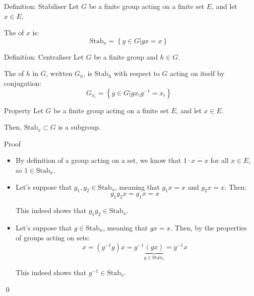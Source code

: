 \documentclass[a4paper]{article}
\begin{document}
\begin{parag}{Definition: Stabiliser}
    Let $G$ be a finite group acting on a finite set $E$, and let $x \in E$.

    The  of $x$ is: 
    \[\text{Stab}_x = \left\{g \in G | gx = x\right\}\]
\end{parag}

\begin{parag}{Definition: Centraliser}
    Let $G$ be a finite group and $h \in G$.

    The  of $h$ in $G$, written $G_h$, is $\text{Stab}_h$ with respect to $G$ acting on itself by conjugation:
    \[G_{x_i} = \left\{g \in G | g x_i g^{-1} = x_i\right\}\]
\end{parag}

\begin{parag}{Property}
    Let $G$ be a finite group acting on a finite set $E$, and let $x \in E$.

    Then, $\text{Stab}_x \subset G$ is a subgroup.

    \begin{subparag}{Proof}
        \begin{itemize}[left=0pt]
            \item By definition of a group acting on a set, we know that $1\cdot x = x$ for all $x \in E$, so $1 \in \text{Stab}_x$.
            \item Let's suppose that $g_1, g_2 \in \text{Stab}_x$, meaning that $g_1 x = x$ and $g_2 x = x$. Then: 
            \[g_1 g_2 x = g_1 x = x\]
            
            This indeed shows that $g_1 g_2 \in \text{Stab}_x$.
            \item Let's suppose that $g \in \text{Stab}_x$, meaning that $gx = x$. Then, by the properties of groups acting on sets: 
            \[x = \left(g^{-1} g\right)x = g^{-1} \underbrace{\left(g x\right)}_{g \in \text{Stab}_x} = g^{-1} x\]
            
            This indeed shows that $g^{-1} \in \text{Stab}_x$.
        \end{itemize}
        
        \qed
    \end{subparag}
\end{parag}
\end{document}
